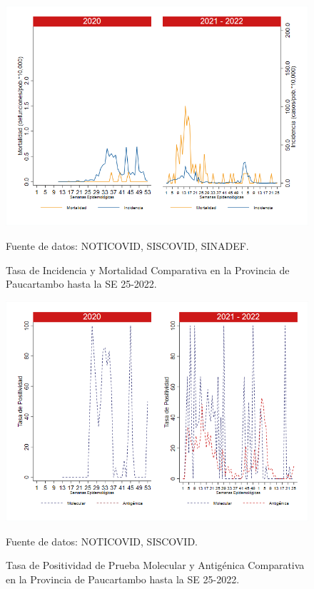 \documentclass[12pt,a4paper,openany]{book}
\begin{document}
	\begin{figure}[h]
		\caption{Tasa de Incidencia y Mortalidad Comparativa en la Provincia de Paucartambo hasta la SE 25-2022.}\label{fig:inc_mort_paucartam}
		\begin{center}
			\includegraphics[width=0.85\linewidth]{../figuras/incidencia_mortalidad_20_21_11.png}
		\end{center}
		{\footnotesize {Fuente de datos: NOTICOVID, SISCOVID, SINADEF.}}
	\end{figure}
	
	\begin{figure}[h]
		\caption{Tasa de Positividad de Prueba Molecular y Antigénica Comparativa en la Provincia de Paucartambo hasta la SE 25-2022.}\label{fig:positividad_paucartam}
		\begin{center}
			\includegraphics[width=0.7\linewidth]{../figuras/positividad_20_21_11.png}
		\end{center}
		{\footnotesize {Fuente de datos: NOTICOVID, SISCOVID.}}
	\end{figure}
	
\end{document}
